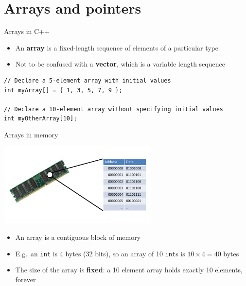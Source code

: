 \part{Arrays and pointers}
\frame{\partpage}

\begin{frame}[fragile]{Arrays in C++}
    \begin{itemize}
        \item An \textbf{array} is a fixed-length sequence of elements of a particular type
        \item Not to be confused with a \textbf{vector}, which is a variable length sequence
    \end{itemize}
    \begin{lstlisting}
// Declare a 5-element array with initial values
int myArray[] = { 1, 3, 5, 7, 9 };

// Declare a 10-element array without specifying initial values
int myOtherArray[10];
    \end{lstlisting}
\end{frame}

\begin{frame}[fragile]{Arrays in memory}
    \begin{center}
        \includegraphics[width=0.6\textwidth]{memory.pdf}
    \end{center}
    \begin{itemize}
        \item An array is a contiguous block of memory
        \item E.g.\ an \lstinline{int} is 4 bytes (32 bits), so an array of 10 \lstinline{int}s is $10 \times 4 = 40$ bytes
        \item The size of the array is \textbf{fixed}: a 10 element array holds exactly 10 elements, forever
    \end{itemize}
\end{frame}

